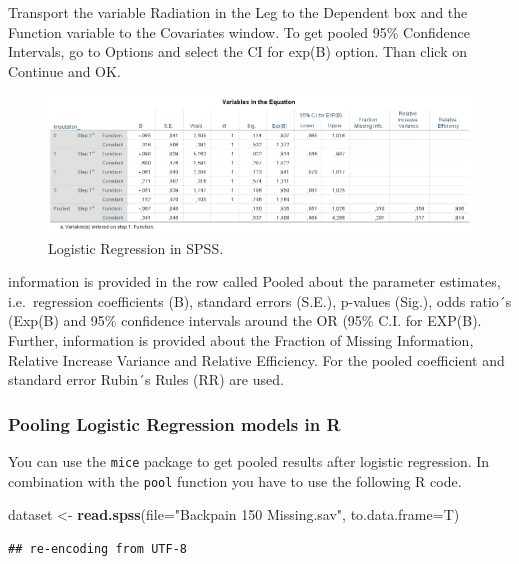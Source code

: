\documentclass[]{book}
\newenvironment{Shaded}{\begin{snugshade}}{\end{snugshade}}
\newcommand{\KeywordTok}[1]{\textcolor[rgb]{0.13,0.29,0.53}{\textbf{#1}}}
\newcommand{\DataTypeTok}[1]{\textcolor[rgb]{0.13,0.29,0.53}{#1}}
\newcommand{\StringTok}[1]{\textcolor[rgb]{0.31,0.60,0.02}{#1}}
\newcommand{\NormalTok}[1]{#1}
\begin{document}
Transport the variable Radiation in the Leg to the Dependent box and the
Function variable to the Covariates window. To get pooled 95\%
Confidence Intervals, go to Options and select the CI for exp(B) option.
Than click on Continue and OK.

\begin{figure}

{\centering \includegraphics[width=0.9\linewidth]{images/table5.9} 

}

\caption{Logistic Regression in SPSS.}\label{fig:tab5-9}
\end{figure}

information is provided in the row called Pooled about the parameter
estimates, i.e.~regression coefficients (B), standard errors (S.E.),
p-values (Sig.), odds ratio´s (Exp(B) and 95\% confidence intervals
around the OR (95\% C.I. for EXP(B). Further, information is provided
about the Fraction of Missing Information, Relative Increase Variance
and Relative Efficiency. For the pooled coefficient and standard error
Rubin´s Rules (RR) are used.

\subsubsection{Pooling Logistic Regression models in
R}\label{pooling-logistic-regression-models-in-r}

You can use the \texttt{mice} package to get pooled results after
logistic regression. In combination with the \texttt{pool} function you
have to use the following R code.

\begin{Shaded}
\begin{Highlighting}[]
\NormalTok{dataset <-}\StringTok{ }\KeywordTok{read.spss}\NormalTok{(}\DataTypeTok{file=}\StringTok{"Backpain 150 Missing.sav"}\NormalTok{, }\DataTypeTok{to.data.frame=}\NormalTok{T)}
\end{Highlighting}
\end{Shaded}

\begin{verbatim}
## re-encoding from UTF-8
\end{verbatim}
\end{document}
